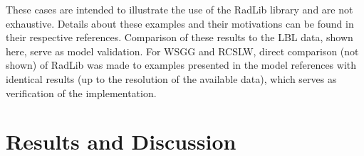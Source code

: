 \documentclass[preprint,12pt]{elsarticle}
\begin{document}
These cases are intended to illustrate the use of the RadLib library and are not exhaustive. Details about these examples and their motivations can be found in their respective references. Comparison of these results to the LBL data, shown here, serve as model validation. For WSGG and RCSLW, direct comparison (not shown) of RadLib was made to examples presented in the model references with identical results (up to the resolution of the available data), which serves as verification of the implementation.


\section{Results and Discussion} \label{s:discussion}
\end{document}
